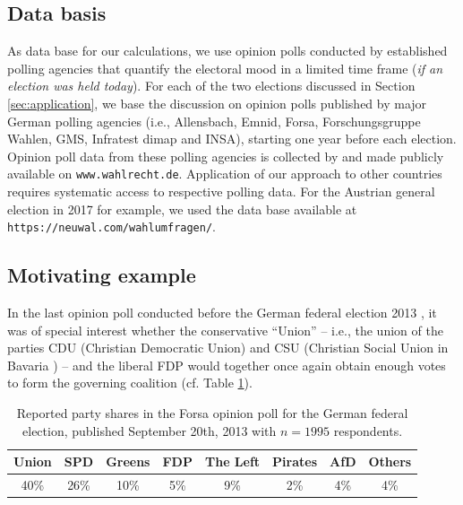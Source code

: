 \documentclass[smallcondensed]{svjour3}     %
\begin{document}
\subsection{Data basis}\label{ssec:data-basis}
As data base for our calculations, we use opinion polls conducted by established
polling agencies that quantify the electoral mood in a limited time frame
(\textit{if an election was held today}). For each of the two elections discussed
in Section \ref{sec:application}, we base the discussion on opinion polls published
by major German polling agencies (i.e., Allensbach, Emnid, Forsa, Forschungsgruppe Wahlen,
GMS, Infratest dimap and INSA), starting one year before each election.
Opinion poll data from these polling agencies is collected by and made publicly available
on \texttt{www.wahlrecht.de}. Application of our approach to other countries
requires systematic access to respective polling data. For the Austrian general
election in 2017 for example, we used the data base available at
\texttt{https://neuwal.com/wahlumfragen/}.


\subsection{Motivating example}\label{ssec:intro-ex-fdp}
In the last opinion poll conducted before the German federal election 2013 \citep{forsa_2013},
it was of special interest whether the conservative ``Union'' -- i.e., the union of
the parties CDU (Christian Democratic Union) and CSU (Christian Social Union in Bavaria ) --
and the liberal FDP would together once again obtain enough votes to form the
governing coalition (cf. Table \ref{tab_fdp}).

\begin{table}[!ht]\centering
\caption{Reported party shares in the Forsa opinion poll for the German federal
election, published September 20th, 2013 with $n=1995$ respondents.
\label{tab_fdp}
}
\medskip
\begin{tabular}{cccccccc}
\toprule[0.09 em]
Union & SPD & Greens & FDP & The Left & Pirates & AfD & Others \\
\midrule
40\% & 26\% & 10\% & 5\% & 9\% & 2\% & 4\% & 4\% \\
\bottomrule[0.09 em]
\end{tabular}
\end{table}
\end{document}
